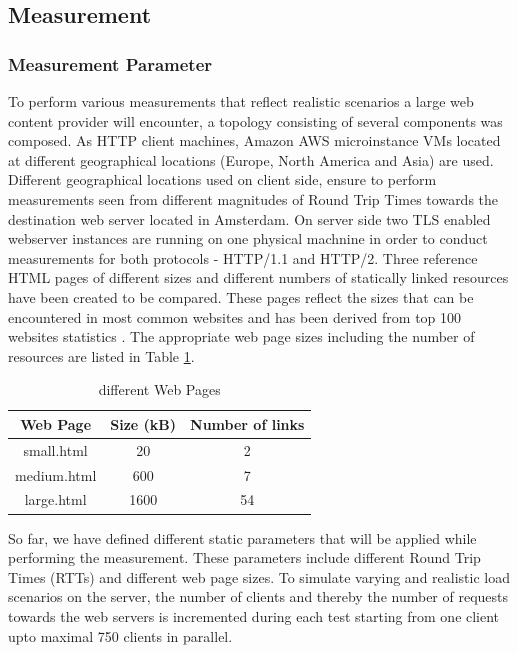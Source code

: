 \subsection{Measurement}
\subsubsection{Measurement Parameter}
\label{subsec:measurements}
To perform various measurements that reflect realistic scenarios a large web content provider will encounter, a topology consisting of several components was composed. As HTTP client machines, Amazon AWS microinstance VMs \cite{amazon} located at different geographical locations (Europe, North America and Asia) are used. Different geographical locations used on client side, ensure to perform measurements seen from different magnitudes of Round Trip Times towards the destination web server located in Amsterdam. On server side two TLS enabled webserver instances are running on one physical machnine in order to conduct measurements for both protocols - HTTP/1.1 and HTTP/2. Three reference HTML pages of different sizes and different numbers of statically linked resources have been created to be compared. These pages reflect the sizes that can be encountered in most common websites and has been derived from top 100 websites statistics \cite{httparchive}. The appropriate web page sizes including the number of resources are listed in Table \ref{table:pages}.

\begin{table}[h]
	\centering
\begin{tabular}{ | c | c | c | }

\hline
\textbf{Web Page} & \textbf{Size (kB)} & \textbf{Number of links}\\ \hline \hline
small.html &  20 & 2 \\ \hline
medium.html &  600 & 7\\ \hline 
large.html &  1600 & 54 \\
\hline
\end{tabular}
\caption{different Web Pages}
\label{table:pages}
\end{table}

So far, we have defined different static parameters that will be applied while performing the measurement. These parameters include different Round Trip Times (RTTs) and different web page sizes.  
To simulate varying and realistic load scenarios on the server, the number of clients and thereby the number of requests towards the web servers is incremented during each test starting from one client upto maximal 750 clients in parallel.
\\  
